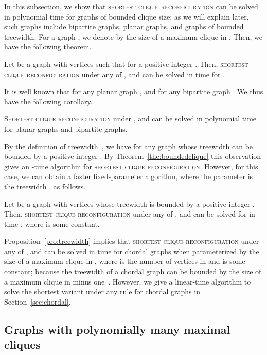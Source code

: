 \documentclass{llncs}
\newcounter{one}
\begin{document}
	In this subsection, we show that \textsc{shortest clique reconfiguration} can be solved in polynomial time for graphs of bounded clique size; 
as we will explain later, such graphs include bipartite graphs, planar graphs, and graphs of bounded treewidth.
	For a graph , we denote by  the size of a maximum clique in .
	Then, we have the following theorem. 
	\begin{theorem} \label{the:boundedclique}
	Let  be a graph with  vertices such that  for a positive integer . 
	Then, \textsc{shortest clique reconfiguration} under any of ,  and  can be solved in time  for . 
\end{theorem}
	
	It is well known that  for any planar graph , and  for any bipartite graph .
	We thus have the following corollary. 
	\begin{corollary}
	\textsc{Shortest clique reconfiguration} under ,  and  can be solved in polynomial time for planar graphs and bipartite graphs.
	\end{corollary}
	
	By the definition of treewidth~\cite{BodlaenderDDFLP13}, we have  for any graph  whose treewidth can be bounded by a positive integer .
	By Theorem~\ref{the:boundedclique} this observation gives an -time algorithm for \textsc{shortest clique reconfiguration}.
	However, for this case, we can obtain a faster fixed-parameter algorithm, where the parameter is the treewidth , as follows.
	\begin{proposition} \label{pro:treewidth}
	Let  be a graph with  vertices whose treewidth is bounded by a positive integer .
	Then, \textsc{shortest clique reconfiguration} under any of ,  and  can be solved for  in time , where  is some constant.
	\end{proposition}

	Proposition~\ref{pro:treewidth} implies that \textsc{shortest clique reconfiguration} under any of ,  and  can be solved in time  for chordal graphs  when parameterized by the size  of a maximum clique in , where  is the number of vertices in  and  is some constant; because the treewidth of a chordal graph  can be bounded by the size of a maximum clique in  minus one~\cite{RS86}. 
	However, we give a linear-time algorithm to solve the shortest variant under any rule for chordal graphs in Section~\ref{sec:chordal}.


	\subsection{Graphs with polynomially many maximal cliques}
	\label{subsec:polymany}
	
\end{document}
